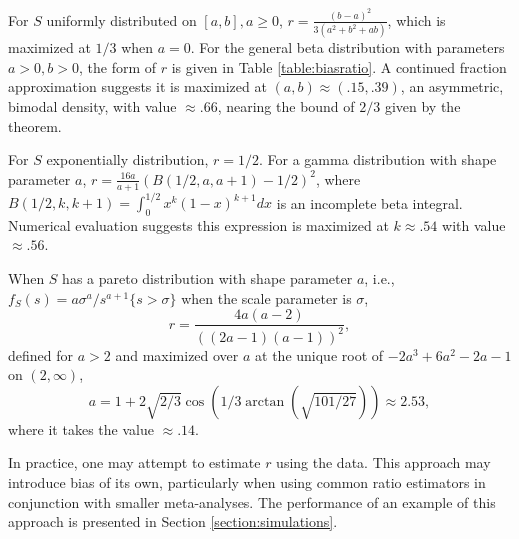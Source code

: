 \documentclass[12pt]{article}
\newcommand{\biasratio}{r}%
\newcommand{\s}{S}
\DeclareMathOperator{\E}{E}
\DeclareMathOperator{\V}{Var}
\newcommand{\comment}[1]{
  \iftoggle{commenttoggle}{
    {\normalsize{\color{red}{ #1}}\normalsize}
  }
  {}
}
\begin{document}

  For $S$ uniformly distributed on $[a,b], a\ge 0$,
  $\biasratio = \frac{(b-a)^2}{3(a^2+b^2+ab)}$, which is maximized at
  $1/3$ when $a=0$. For the general beta distribution with parameters
  $a>0,b>0$, the form of $\biasratio$ is given in Table
  \ref{table:biasratio}. A continued fraction approximation suggests
  it is maximized at $(a,b)\approx (.15,.39)$, an asymmetric, bimodal density, with value
  $\approx .66$, nearing the bound of $2/3$ given by the theorem. %
  
  
  For $S$ exponentially distribution, $\biasratio = 1/2$. For a gamma
  distribution with shape parameter $a$,
  $\biasratio=\frac{16a}{a+1}(B(1/2,a,a+1)-1/2)^2$, where
  $B(1/2,k,k+1)=\int_0^{1/2}x^k(1-x)^{k+1}dx$ is an incomplete beta
  integral. Numerical evaluation suggests this expression is maximized
  at $k\approx .54$ with value $\approx .56$.

  
  When $S$ has a pareto distribution with shape parameter $a$, i.e., $f_S(s) =a\sigma^a/s^{a+1}\{s>\sigma\}$ when the scale parameter is $\sigma$,
  $$
  \biasratio = \frac{4a(a-2)}{((2a-1)(a-1))^2},
  $$
  defined for $a>2$ and maximized over $a$ at the unique root of $-2a^3+6a^2-2a-1$ on $(2,\infty)$,
  $$
  a=1+2\sqrt{2/3}\cos\left( 1/3\arctan\left(\sqrt{101/27}\right)  \right) \approx 2.53,
  $$
  where it takes the value $\approx .14$.

  In practice, one may attempt to estimate $\biasratio$ using the
  data. This approach may introduce bias of its own, particularly when
  using common ratio estimators in conjunction with  smaller
  meta-analyses. The performance of an example of this approach is presented in Section \ref{section:simulations}.
\end{document}
